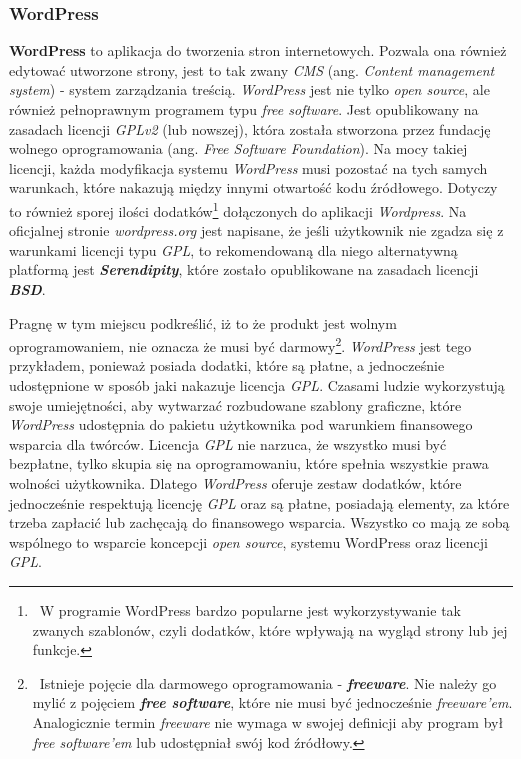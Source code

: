 \documentclass{article}
\begin{document}
\subsubsection{WordPress}

\hspace{4mm} \textbf{WordPress} to aplikacja do tworzenia stron internetowych. Pozwala ona również edytować utworzone strony, jest to tak zwany \emph{CMS} (ang. \emph{Content management system}) - system zarządzania treścią. \emph{WordPress} jest nie tylko \emph{open source}, ale również pełnoprawnym programem typu \emph{free software}. Jest opublikowany na zasadach licencji \emph{GPLv2} (lub nowszej), która została stworzona przez fundację wolnego oprogramowania (ang. \emph{Free Software Foundation})\cite{wordpress.license}. Na mocy takiej licencji, każda modyfikacja systemu \emph{WordPress} musi pozostać na tych samych warunkach, które nakazują między innymi otwartość kodu źródłowego. Dotyczy to również sporej ilości dodatków\footnote{\, W programie WordPress bardzo popularne jest wykorzystywanie tak zwanych szablonów, czyli dodatków, które wpływają na wygląd strony lub jej funkcje.} dołączonych do aplikacji \emph{Wordpress}. Na oficjalnej stronie \emph{wordpress.org} jest napisane, że jeśli użytkownik nie zgadza się z warunkami licencji typu \emph{GPL}, to rekomendowaną dla niego alternatywną platformą jest \textbf{\emph{Serendipity}}, które zostało opublikowane na zasadach licencji \textbf{\emph{BSD}}\cite{wordpress.license}.

Pragnę w tym miejscu podkreślić, iż to że produkt jest wolnym oprogramowaniem, nie oznacza że musi być darmowy\footnote{\, Istnieje pojęcie dla darmowego oprogramowania - \textbf{\emph{freeware}}. Nie należy go mylić z pojęciem \textbf{\emph{free software}}, które nie musi być jednocześnie \emph{freeware'em}. Analogicznie termin \emph{freeware} nie wymaga w swojej definicji aby program był \emph{free software'em} lub udostępniał swój kod źródłowy\cite{wiki.freeware}.}. \emph{WordPress} jest tego przykładem, ponieważ posiada dodatki, które są płatne, a jednocześnie udostępnione w sposób jaki nakazuje licencja \emph{GPL}. Czasami ludzie wykorzystują swoje umiejętności, aby wytwarzać rozbudowane szablony graficzne, które \emph{WordPress} udostępnia do pakietu użytkownika pod warunkiem finansowego wsparcia dla twórców. Licencja \emph{GPL} nie narzuca, że wszystko musi być bezpłatne, tylko skupia się na oprogramowaniu, które spełnia wszystkie prawa wolności użytkownika. Dlatego \emph{WordPress} oferuje zestaw dodatków, które jednocześnie respektują licencję \emph{GPL} oraz są płatne, posiadają elementy, za które trzeba zapłacić lub zachęcają do finansowego wsparcia. Wszystko co mają ze sobą wspólnego to wsparcie koncepcji \emph{open source}, systemu WordPress oraz licencji \emph{GPL}\cite{wordpress.commercial}.
\end{document}
